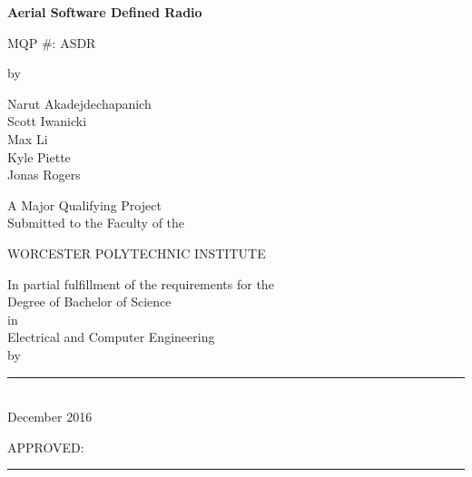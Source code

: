 \documentclass[12pt]{report}
\begin{document}
	
	
	
	\newcommand{\brk}{\vspace*{0.18in}}
	
	\thispagestyle{empty}
	
	\begin{center}
		
		\brk
		
		
		{\large 
			\textbf{
				Aerial Software Defined Radio
			}
		}
		
		MQP \#: ASDR
		
		\brk
		by
		
		\brk
		Narut Akadejdechapanich\\Scott Iwanicki\\Max Li\\Kyle Piette\\Jonas Rogers
		
		\brk\brk
		A Major Qualifying Project\\
		Submitted to the Faculty of the 
		
		\brk
		WORCESTER POLYTECHNIC INSTITUTE
		
		\brk
		In partial fulfillment of the requirements for the\\
		Degree of Bachelor of Science\\
		in\\
		Electrical and Computer Engineering\\
		by
		
		\brk\brk
		\rule{3in}{1.2pt}\\
		December 2016
		
	\end{center}
	
	
	APPROVED:
	
	\vspace{0.5in}
	\rule{3in}{0.8pt}
	
\end{document}

